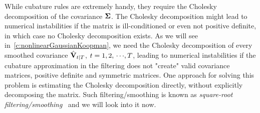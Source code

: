 		While cubature rules are extremely handy, they require the Cholesky decomposition of the covariance \( \boldsymbol{\mathrm{\Sigma}} \). The Cholesky decomposition might lead to numerical instabilities if the matrix is ill-conditioned or even not positive definite, in which case no Cholesky decomposition exists. As we will see in~\autoref{c:nonlinearGaussianKoopman}, we need the Cholesky decomposition of every smoothed covariance \( \hat{\boldsymbol{\mathrm{V}}}_{t \vert T} \), \( t = 1, 2, \,\cdots\!, T \), leading to numerical instabilities if the cubature approximation in the filtering does not "create" valid covariance matrices, \ie positive definite and symmetric matrices. One approach for solving this problem is estimating the Cholesky decomposition directly, without explicitly decomposing the matrix. Such filtering/smoothing is known as \emph{square-root filtering/smoothing}~\cite{vandermerweSquarerootUnscentedKalman2001,ruttenSquarerootUnscentedFiltering2013} and we will look into it now.

